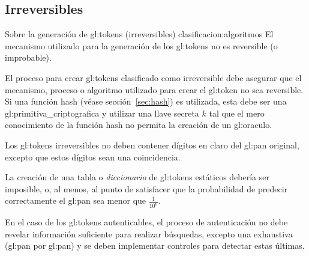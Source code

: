 %
%

\subsection{Irreversibles}

\requerimientoConClasificacion
{Sobre la generación de 
  \texorpdfstring{\glspl{gl:token}}{tokens} (irreversibles)}
{clasificacion:algoritmos}
{
  El mecanismo utilizado para la generación de los \glspl{gl:token}
  no es reversible (o improbable).
}

{
  El proceso para crear \glspl{gl:token} clasificado como irreversible
  debe asegurar que el mecanismo, proceso o algoritmo utilizado para
  crear el \gls{gl:token} no sea reversible. Si una función hash (véase
  sección~\ref{sec:hash}) es utilizada, esta debe ser una
  \gls{gl:primitiva_criptografica} y utilizar una llave secreta $k$ tal que
  el mero conocimiento de la función hash no permita la creación de un
  \gls{gl:oraculo}.
}

{
  Los \glspl{gl:token} irreversibles no deben contener dígitos en claro del
  \gls{gl:pan} original, excepto que estos dígitos sean una coincidencia.
}

{
  La creación de una tabla o \textit{diccionario} de \glspl{gl:token}
  estáticos debería ser imposible, o, al menos, al punto de satisfacer que
  la probabilidad de predecir correctamente el \gls{gl:pan} sea menor que
  $\frac{1}{10^6}$.
}

{
  En el caso de los \glspl{gl:token} autenticables, el proceso de
  autenticación no debe revelar información suficiente para realizar
  búsquedas, excepto una exhaustiva (\gls{gl:pan} por \gls{gl:pan}) y se
  deben implementar controles para detectar estas últimas.
}

